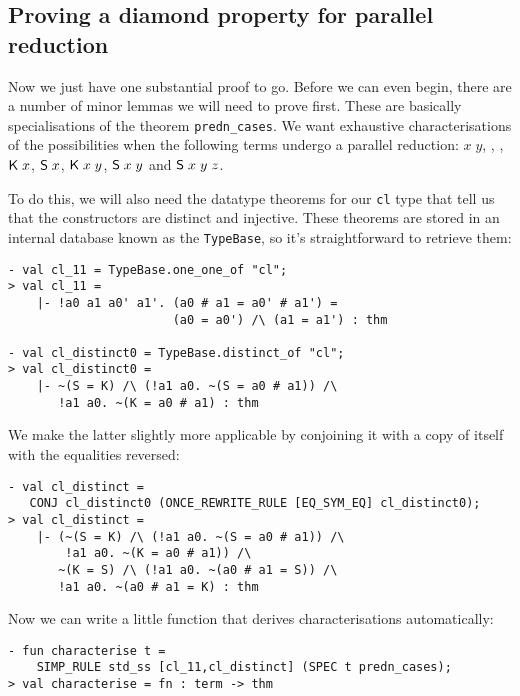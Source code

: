 \subsection{Proving a diamond property for parallel reduction}
\label{sec:predn-diamond}

Now we just have one substantial proof to go.  Before we can even
begin, there are a number of minor lemmas we will need to prove first.
These are basically specialisations of the theorem
\texttt{predn\_cases}.  We want exhaustive characterisations of the
possibilities when the following terms undergo a parallel reduction:
$x\;y$, \KC, \SC, ${\sf K}\;x$, ${\sf S}\;x$, ${\sf K}\;x\;y$, ${\sf S}\;x\;y$ and
${\sf S}\;x\;y\;z$.

To do this, we will also need the datatype theorems for our
\texttt{cl} type that tell us that the constructors are distinct and
injective.  These theorems are stored in an internal database known as
the \texttt{TypeBase}, so it's straightforward to retrieve them:
\begin{session}\begin{verbatim}
- val cl_11 = TypeBase.one_one_of "cl";
> val cl_11 =
    |- !a0 a1 a0' a1'. (a0 # a1 = a0' # a1') =
                       (a0 = a0') /\ (a1 = a1') : thm

- val cl_distinct0 = TypeBase.distinct_of "cl";
> val cl_distinct0 =
    |- ~(S = K) /\ (!a1 a0. ~(S = a0 # a1)) /\
       !a1 a0. ~(K = a0 # a1) : thm
\end{verbatim}\end{session}
We make the latter slightly more applicable by conjoining it with
a copy of itself with the equalities reversed:
\begin{session}\begin{verbatim}
- val cl_distinct =
   CONJ cl_distinct0 (ONCE_REWRITE_RULE [EQ_SYM_EQ] cl_distinct0);
> val cl_distinct =
    |- (~(S = K) /\ (!a1 a0. ~(S = a0 # a1)) /\
        !a1 a0. ~(K = a0 # a1)) /\
       ~(K = S) /\ (!a1 a0. ~(a0 # a1 = S)) /\
       !a1 a0. ~(a0 # a1 = K) : thm
\end{verbatim}\end{session}
    Now we can write a little function that derives characterisations
    automatically:
\begin{session}\begin{verbatim}
- fun characterise t =
    SIMP_RULE std_ss [cl_11,cl_distinct] (SPEC t predn_cases);
> val characterise = fn : term -> thm
\end{verbatim}\end{session}
